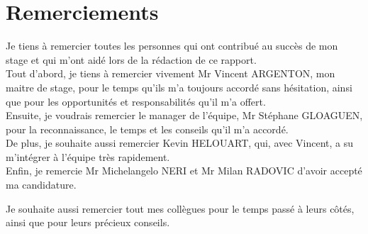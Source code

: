 \chapter*{Remerciements} %

Je tiens à remercier toutes les personnes qui ont contribué au succès de mon stage et qui m'ont aidé lors de la rédaction de ce rapport.  \\

Tout d'abord, je tiens à remercier vivement Mr Vincent ARGENTON, mon maitre de stage, pour le temps qu'ils m'a toujours accordé sans hésitation, ainsi que pour les opportunités et responsabilités qu'il m'a offert. \\

	Ensuite, je voudrais remercier le manager de l'équipe, Mr Stéphane GLOAGUEN, pour la reconnaissance, le temps et les conseils qu'il m'a accordé. \\
	
	De plus, je souhaite aussi remercier Kevin HELOUART, qui, avec Vincent, a su m'intégrer à l'équipe très rapidement.  \\

Enfin, je remercie Mr Michelangelo NERI et Mr Milan RADOVIC d'avoir accepté ma candidature.

Je souhaite aussi remercier tout mes collègues pour le temps passé à leurs côtés, ainsi que pour leurs précieux conseils.